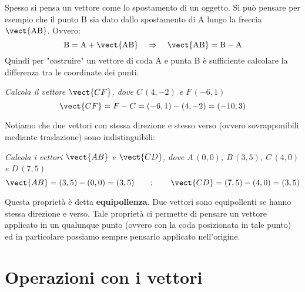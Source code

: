 Spesso si pensa un vettore come lo spostamento di un oggetto. Si può pensare per esempio che il punto B sia dato dallo spostamento di A lungo la freccia \(\vect{\text{AB}}\). Ovvero:
\[\text{B} = \text{A}+\vect{\text{AB}} \quad \Rightarrow \quad \vect{\text{AB}} = \text{B}-\text{A}\]
Quindi per "costruire" un vettore di coda A e punta B è sufficiente calcolare la differenza tra le coordinate dei punti.
\begin{esempio}
\emph{Calcola il vettore \(\vect{CF}\), dove \(C\,(4,-2)\) e \(F \, (-6,1)\)}
\[\vect{CF} = F-C = (-6,1)-(4,-2) = (-10,3)\]
\end{esempio}

Notiamo che due vettori con stessa direzione e stesso verso (ovvero sovrapponibili mediante traslazione) sono indistinguibili:
\begin{esempio}
\emph{Calcola i vettori \(\vect{AB}\) e \(\vect{CD}\), dove \(A\,(0,0)\), \(B \, (3,5)\), \(C \, (4,0)\) e \(D \, (7,5)\)}
\[\vect{AB} = (3,5)-(0,0) = (3,5) \qquad;\qquad \vect{CD} = (7,5)-(4,0) = (3,5)\]
\end{esempio}
Questa proprietà è detta \textbf{equipollenza}. Due vettori sono equipollenti se hanno stessa direzione e verso. Tale proprietà ci permette di pensare un vettore applicato in un qualunque punto (ovvero con la coda posizionata in tale punto) ed in particolare possiamo sempre pensarlo applicato nell'origine.

\section{Operazioni con i vettori}

